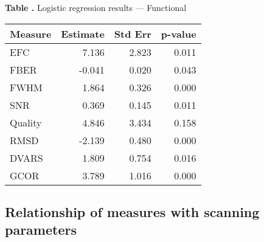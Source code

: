 \begin{table}
  \textbf{\label{tab_log_reg_func} Table .}{ Logistic regression results --- Functional }
  \begin{center}
    \begin{tabular}{ l r r r }
    \hline
    Measure &Estimate & Std Err & p-value  \\ \hline
    EFC	    &	7.136	&	2.823	&	0.011	\\
    FBER	&	-0.041  &	0.020	&	0.043	\\
    FWHM	&	1.864	&	0.326	&	0.000	\\
    SNR	    &	0.369	&	0.145	&	0.011	\\
    Quality	&	4.846	&	3.434	&	0.158	\\
    RMSD	&	-2.139  &	0.480	&	0.000	\\
    DVARS	&	1.809	&	0.754	&	0.016	   \\
    GCOR	&	3.789	&	1.016	&	0.000	\\
    \hline
    \end{tabular}
  \end{center}
\end{table}


\subsection{Relationship of measures with scanning parameters}


